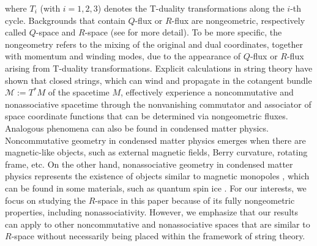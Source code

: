 \documentclass[reqno]{amsart}
\theoremstyle{definition}
\theoremstyle{remark}
\begin{document}
    where $T_i$ (with $i=1,2,3$) denotes the T-duality transformations along the $i$-th cycle. Backgrounds that contain $Q$-flux or $R$-flux are nongeometric, respectively called $Q$-space and $R$-space (see \cite{plauschinn2019non,shelton2005nongeometric} for more detail). To be more specific, the nongeometry refers to the mixing of the original and dual coordinates, together with momentum and winding modes, due to the appearance of $Q$-flux or $R$-flux arising from T-duality transformations. Explicit calculations in string theory have shown that closed strings, which can wind and propagate in the cotangent bundle $\mathcal{M}:=T^*M$ of the spacetime $M$, effectively experience a noncommutative and nonassociative spacetime through the nonvanishing commutator and associator of space coordinate functions that can be determined via nongeometric fluxes. Analogous phenomena can also be found in condensed matter physics. Noncommutative geometry in condensed matter physics \cite{bellissard1994noncommutative,prodan2016bulk,du2024noncommutative} emerges when there are magnetic-like objects, such as external magnetic fields, Berry curvature, rotating frame, etc. On the other hand, nonassociative geometry in condensed matter physics represents the existence of objects similar to magnetic monopoles \cite{szabo2018magnetic}, which can be found in some materials, such as quantum spin ice \cite{morris09monopole}. For our interests, we focus on studying the $R$-space in this paper because of its fully nongeometric properties, including nonassociativity. However, we emphasize that our results can apply to other noncommutative and nonassociative spaces that are similar to $R$-space without necessarily being placed within the framework of string theory.
\end{document}
